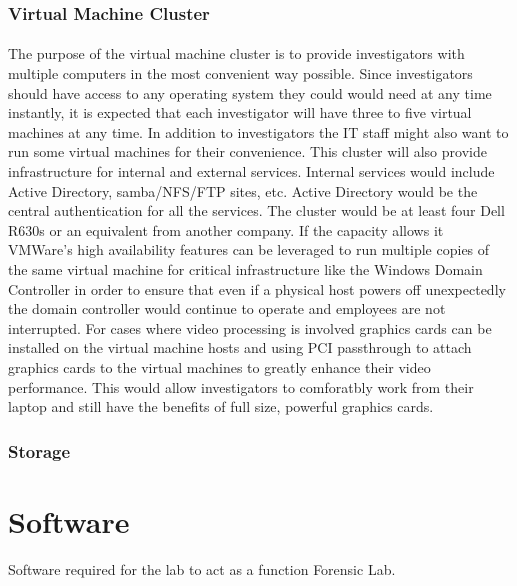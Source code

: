 \documentclass{article}
\begin{document}
\subsubsection{Virtual Machine Cluster} \paragraph{} The purpose of the virtual machine cluster is to provide investigators with multiple computers in the most convenient way possible.
Since investigators should have access to any operating system they could would need at any time instantly, it is expected that each investigator will have three to five virtual machines at any time.
In addition to investigators the IT staff might also want to run some virtual machines for their convenience.
This cluster will also provide infrastructure for internal and external services.
Internal services would include Active Directory, samba/NFS/FTP sites, etc.
Active Directory would be the central authentication for all the services.
The cluster would be at least four Dell R630s or an equivalent from another company.
If the capacity allows it VMWare's high availability features can be leveraged to run multiple copies of the same virtual machine for critical infrastructure like the Windows Domain Controller in order to ensure that even if a physical host powers off unexpectedly the domain controller would continue to operate and employees are not interrupted.
For cases where video processing is involved graphics cards can be installed on the virtual machine hosts and using PCI passthrough to attach graphics cards to the virtual machines to greatly enhance their video performance.
This would allow investigators to comforatbly work from their laptop and still have the benefits of full size, powerful graphics cards.

\subsubsection{Storage} \paragraph{} 


\section{Software}
Software required for the lab to act as a function Forensic Lab.
\end{document}
